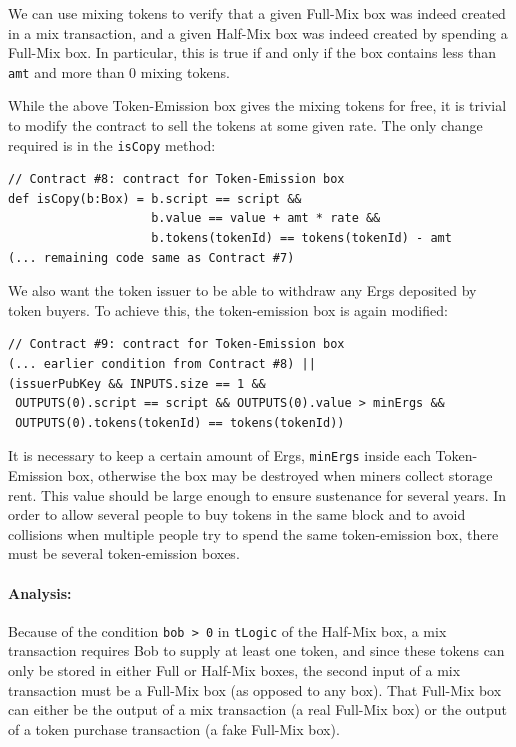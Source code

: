 \documentclass[runningheads]{llncs}
\begin{document}
We can use mixing tokens to verify that a given Full-Mix box was indeed created in a mix transaction, and a given Half-Mix box was indeed created by spending a Full-Mix box. In particular, this is true if and only if the box contains less than \texttt{amt} and more than 0 mixing tokens.  

While the above Token-Emission box gives the mixing tokens for free, it is trivial to modify the contract to sell the tokens at some given rate. The only change required is in the \texttt{isCopy} method:

{\small
\begin{Verbatim}[frame=single]
// Contract #8: contract for Token-Emission box
def isCopy(b:Box) = b.script == script && 
                    b.value == value + amt * rate &&
                    b.tokens(tokenId) == tokens(tokenId) - amt
(... remaining code same as Contract #7)
\end{Verbatim}
}

We also want the token issuer to be able to withdraw any Ergs deposited by token buyers. To achieve this, the token-emission box is again modified:

{\small
\begin{Verbatim}[frame=single]
// Contract #9: contract for Token-Emission box
(... earlier condition from Contract #8) || 
(issuerPubKey && INPUTS.size == 1 && 
 OUTPUTS(0).script == script && OUTPUTS(0).value > minErgs &&
 OUTPUTS(0).tokens(tokenId) == tokens(tokenId))
\end{Verbatim}
}
It is necessary to keep a certain amount of Ergs, \texttt{minErgs} inside each Token-Emission box, otherwise the box may be destroyed when miners collect storage rent. This value should be large enough to ensure sustenance for several years. 
In order to allow several people to buy tokens in the same block and to avoid collisions when multiple people try to spend the same token-emission box, there must be several token-emission boxes. 

\paragraph{Analysis:} 
Because of the condition \texttt{bob > 0} in \texttt{tLogic} of the Half-Mix box, a mix transaction requires Bob to supply at least one token, and since these tokens can only be stored in either Full or Half-Mix boxes, the second input of a mix transaction must be a Full-Mix box (as opposed to any box).
That Full-Mix box can either be the output of a mix transaction (a real Full-Mix box) or the output of a token purchase transaction (a fake Full-Mix box).
\end{document}
